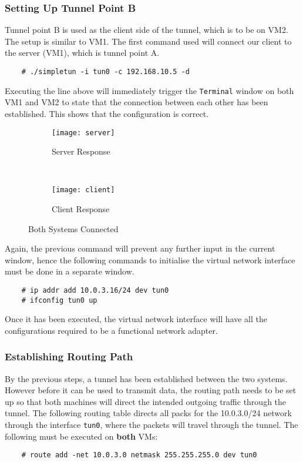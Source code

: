 \documentclass[a4paper,12pt]{article}
\begin{document}
	\subsubsection{Setting Up Tunnel Point B}
	Tunnel point B is used as the client side of the tunnel, which is to be on VM2. The setup is similar to VM1. The first command used will connect our client to the server (VM1), which is tunnel point A.
	\begin{verbatim}
	# ./simpletun -i tun0 -c 192.168.10.5 -d
	\end{verbatim}
	Executing the line above will immediately trigger the \texttt{Terminal} window on both VM1 and VM2 to state that the connection between each other has been established. This shows that the configuration is correct.
	\begin{figure}[H]
		\centering
		\begin{subfigure}[H]{0.9\textwidth}
			\centering
			\texttt{[image: server]}
			\caption{Server Response}
			\label{fig:serverconn}
		\end{subfigure}
		\\
		\begin{subfigure}{0.9\textwidth}
			\centering
			\texttt{[image: client]}
			\caption{Client Response}
			\label{fig:clientconn}
		\end{subfigure}
		\caption{Both Systems Connected}
	\end{figure}
	
	\noindent Again, the previous command will prevent any further input in the current window, hence the following commands to initialise the virtual network interface must be done in a separate window.
	\begin{verbatim}
	# ip addr add 10.0.3.16/24 dev tun0
	# ifconfig tun0 up
	\end{verbatim}
	Once it has been executed, the virtual network interface will have all the configurations required to be a functional network adapter.
	\subsubsection{Establishing Routing Path}
	By the previous steps, a tunnel has been established between the two systems. However before it can be used to transmit data, the routing path needs to be set up so that both machines will direct the intended outgoing traffic through the tunnel. The following routing table directs all packs for the 10.0.3.0/24 network through the interface \texttt{tun0}, where the packets will travel through the tunnel. The following must be executed on \textbf{both} VMs:
	\begin{verbatim}
	# route add -net 10.0.3.0 netmask 255.255.255.0 dev tun0
	\end{verbatim}
\end{document}
